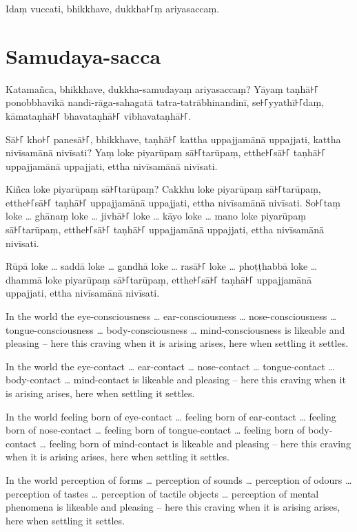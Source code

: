 Idaṃ vuccati, bhikkhave, dukkha꜔꜒ṃ ariyasaccaṃ.

\section*{Samudaya-sacca}

Katamañca, bhikkhave, dukkha-samudayaṃ ariyasaccaṃ? Yāyaṃ taṇhā꜔꜒ ponobbhavikā
nandi-rāga-sahagatā tatra-tatrābhinandinī, se꜔꜒yyathī꜔꜒daṃ, kāmataṇhā꜔꜒ bhavataṇhā꜔꜒
vibhavataṇhā꜔꜒.

Sā꜔꜒ kho꜔꜒ panesā꜔꜒, bhikkhave, taṇhā꜔꜒ kattha uppajjamānā uppajjati, kattha nivīsamānā
nivīsati? Yaṃ loke piyarūpaṃ sā꜔꜒tarūpaṃ, etthe꜔꜒sā꜔꜒ taṇhā꜔꜒ uppajjamānā uppajjati,
ettha nivīsamānā nivīsati.

\enlargethispage{\baselineskip}

Kiñca loke piyarūpaṃ sā꜔꜒tarūpaṃ? Cakkhu loke piyarūpaṃ sā꜔꜒tarūpaṃ, etthe꜔꜒sā꜔꜒ taṇhā꜔꜒
uppajjamānā uppajjati, ettha nivīsamānā nivīsati. So꜔꜒taṃ loke
\ldots{} ghānaṃ loke \ldots{} jivhā꜔꜒ loke \ldots{} kāyo loke \ldots{} mano loke
piyarūpaṃ sā꜔꜒tarūpaṃ, etthe꜔꜒sā꜔꜒ taṇhā꜔꜒ uppajjamānā uppajjati, ettha nivīsamānā
nivīsati.

Rūpā loke \ldots{} saddā loke \ldots{} gandhā loke \ldots{} rasā꜔꜒ loke \ldots{}
phoṭṭhabbā loke \ldots{} dhammā loke piyarūpaṃ sā꜔꜒tarūpaṃ, etthe꜔꜒sā꜔꜒ taṇhā꜔꜒
uppajjamānā uppajjati, ettha nivīsamānā nivīsati.

\englishPage

In the world the eye-consciousness \ldots{} ear-consciousness \ldots{} nose-consciousness
 \ldots{} tongue-consciousness \ldots{} body-consciousness \ldots{} mind-consciousness is likeable
and pleasing -- here this craving when it is arising arises, here when settling
it settles.

In the world the eye-contact \ldots{} ear-contact \ldots{} nose-contact \ldots{}
tongue-contact \ldots{} body-contact \ldots{} mind-contact is likeable and
pleasing -- here this craving when it is arising arises, here when settling it
settles.

In the world feeling born of eye-contact \ldots{} feeling born of ear-contact
\ldots{} feeling born of nose-contact \ldots{} feeling born of tongue-contact
\ldots{} feeling born of body-contact \ldots{} feeling born of mind-contact is
likeable and pleasing -- here this craving when it is arising arises, here when
settling it settles.

In the world perception of forms \ldots{} perception of sounds \ldots{}
perception of odours \ldots{} perception of tastes \ldots{} perception of
tactile objects \ldots{} perception of mental phenomena is likeable and pleasing
-- here this craving when it is arising arises, here when settling it settles.

